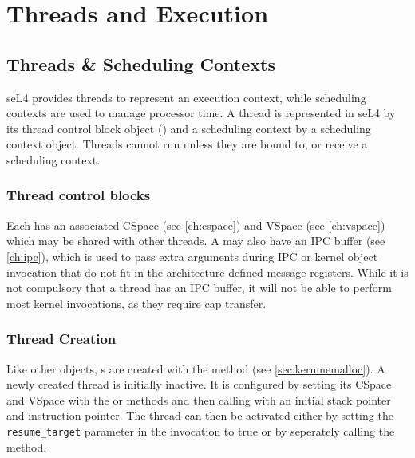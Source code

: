 %
%
%
%

\chapter{\label{ch:threads}Threads and Execution}

\section{Threads \& Scheduling Contexts}
\label{sec:threads}

seL4 provides threads to represent an execution context, while scheduling contexts are used to manage
processor time. 
A thread is represented in seL4 by its thread control block
object () and a scheduling context by a scheduling context object.
Threads cannot run unless they are bound to, or receive a scheduling context.

\subsection{Thread control blocks}

Each  has an associated CSpace (see
\autoref{ch:cspace}) and VSpace (see \autoref{ch:vspace}) which
may be shared with other threads. A  may also have an IPC buffer
(see  \autoref{ch:ipc}), which is used to pass extra arguments during IPC
or kernel object invocation that do not fit in the architecture-defined message
registers. While it is not compulsory that a thread has an IPC buffer,
it will not be able to perform most kernel invocations, as they require
cap transfer.


\subsection{Thread Creation}

Like other objects, s are created with the
 method (see
\autoref{sec:kernmemalloc}). A newly created thread is initially inactive. It
is configured by setting its CSpace and VSpace with the
or  methods and then calling
 with an initial stack pointer and instruction
pointer. The thread can then be activated either by setting the
\texttt{resume\_target} parameter in the  invocation to true
or by seperately calling the  method.

